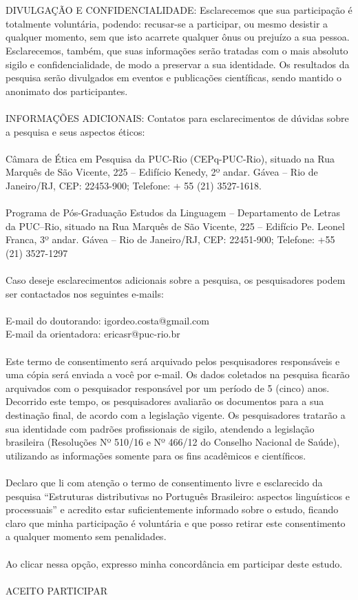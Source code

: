 \\
\\
DIVULGAÇÃO E CONFIDENCIALIDADE: Esclarecemos que sua participação é totalmente voluntária, podendo: recusar-se a participar, ou mesmo desistir a qualquer momento, sem que isto acarrete qualquer ônus ou prejuízo a sua pessoa. Esclarecemos, também, que suas informações serão tratadas com o mais absoluto sigilo e confidencialidade, de modo a preservar a sua identidade. Os resultados da pesquisa serão divulgados em eventos e publicações científicas, sendo mantido o anonimato dos participantes.
\\
\\
INFORMAÇÕES ADICIONAIS: Contatos para esclarecimentos de dúvidas sobre a pesquisa e seus aspectos éticos:
\\
\\
Câmara de Ética em Pesquisa da PUC-Rio (CEPq-PUC-Rio), situado  na Rua Marquês de São Vicente, 225 -- Edifício Kenedy, 2º andar. Gávea -- Rio de Janeiro/RJ, CEP: 22453-900; Telefone: + 55 (21) 3527-1618.
\\
\\
Programa de Pós-Graduação Estudos da Linguagem -- Departamento de Letras da PUC--Rio, situado na Rua Marquês de São Vicente, 225 -- Edifício Pe. Leonel Franca, 3º andar. Gávea -- Rio de Janeiro/RJ, CEP: 22451-900; Telefone: +55 (21) 3527-1297
\\
\\
Caso deseje esclarecimentos adicionais sobre a pesquisa, os pesquisadores podem ser contactados nos seguintes e-mails:
\\
\\
E-mail do doutorando: igordeo.costa@gmail.com \\
E-mail da orientadora: ericasr@puc-rio.br
\\
\\
Este termo de consentimento será arquivado pelos pesquisadores responsáveis e uma cópia será enviada a você por e-mail. Os dados coletados na pesquisa ficarão arquivados com o pesquisador responsável por um período de 5 (cinco) anos. Decorrido este tempo, os pesquisadores avaliarão os documentos para a sua destinação final, de acordo com a legislação vigente. Os pesquisadores tratarão a sua identidade com padrões profissionais de sigilo, atendendo a legislação brasileira (Resoluções Nº 510/16 e Nº 466/12 do Conselho Nacional de Saúde), utilizando as informações somente para os fins acadêmicos e científicos.
\\
\\
Declaro que li com atenção o termo de consentimento livre e esclarecido da pesquisa “Estruturas distributivas no Português Brasileiro: aspectos linguísticos e processuais” e acredito estar suficientemente informado sobre o estudo, ficando claro que minha participação é voluntária e que posso retirar este consentimento a qualquer momento sem penalidades.
\\
\\
Ao clicar nessa opção, expresso minha concordância em participar deste estudo.
\\
\\
ACEITO PARTICIPAR

